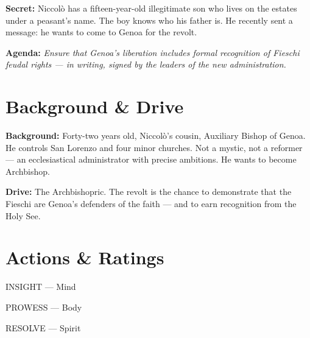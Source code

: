 \clearpage
\begin{secretbox}
\textbf{Secret:} Niccol\`o has a fifteen-year-old illegitimate son who lives on
the estates under a peasant's name. The boy knows who his father is. He recently
sent a message: he wants to come to Genoa for the revolt.

\medskip\noindent\textcolor{SecretRed}{\textbf{Agenda:}} \textit{Ensure that Genoa's
liberation includes formal recognition of Fieschi feudal rights --- in writing,
signed by the leaders of the new administration.}
\end{secretbox}

\clearpage


\section*{Background \& Drive}
\begin{rulebox}{}
\textbf{Background:} Forty-two years old, Niccol\`o's cousin, Auxiliary Bishop of
Genoa. He controls San Lorenzo and four minor churches. Not a mystic, not a reformer
--- an ecclesiastical administrator with precise ambitions. He wants to become
Archbishop.

\medskip\noindent\textcolor{FieschiGreen}{\textbf{Drive:}} The Archbishopric. The
revolt is the chance to demonstrate that the Fieschi are Genoa's defenders of the
faith --- and to earn recognition from the Holy See.
\end{rulebox}

\section*{Actions \& Ratings}
\begin{attributoblock}[FieschiGreen]{INSIGHT --- Mind}
\end{attributoblock}
\begin{attributoblock}[FieschiGreen]{PROWESS --- Body}
\end{attributoblock}
\begin{attributoblock}[FieschiGreen]{RESOLVE --- Spirit}
\end{attributoblock}

